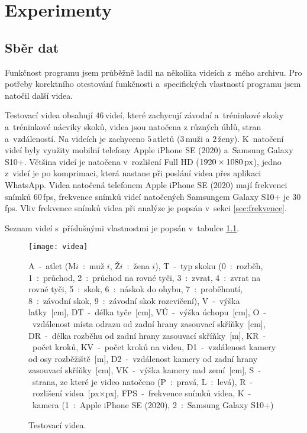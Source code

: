 \chapter{Experimenty}

\section{Sběr dat}

Funkčnost programu jsem průběžně ladil na několika videích z~mého archivu. Pro potřeby korektního otestování funkčnosti a~specifických vlastností programu jsem natočil další videa.

Testovací videa obsahují $46$\,\rm videí, které zachycují závodní a~tréninkové skoky a~tréninkové nácviky skoků, videa jsou natočena z různých úhlů, stran a~vzdáleností. Na videích je zachyceno $5$\,\rm atletů ($3$\,\rm muži a $2$\,\rm ženy). K~natočení videí byly využity mobilní telefony Apple iPhone SE ($2020$) a~Samsung Galaxy S10+. Většina videí je natočena v~rozlišení Full HD ($1920\times 1080\,\rm px$), jedno z~videí je po komprimaci, která nastane při poslání videa přes aplikaci WhatsApp. Videa natočená telefonem Apple iPhone SE ($2020$) mají frekvenci snímků $60$\,\rm fps, frekvence snímků videí natočených Samsungem Galaxy S10+ je $30$\,\rm fps. Vliv frekvence snímků videa při analýze je popsán v~sekci \ref{sec:frekvence}.

Seznam videí s~příslušnými vlastnostmi je popsán v~tabulce \ref{fig:videa}.

\begin{figure}[p]\centering
\texttt{[image: videa]}
\caption{Testovací videa.}
\small
    A~-~atlet 
        (M$i$~:~muž $i$,
        Ž$i$~:~žena $i$), 
    T~-~typ skoku 
        (0~:~rozběh, 
        1~:~průchod, 
        2~:~průchod na rovné tyči, 
        3~:~zvrat, 
        4~:~zvrat na rovné tyči, 
        5~:~skok, 
        6~:~náskok do ohybu, 
        7~:~proběhnutí, 
        8~:~závodní skok, 
        9~:~závodní skok rozcvičení), 
    V~-~výška laťky~[cm], 
    DT~-~délka tyče~[cm], 
    VÚ~-~výška úchopu~[cm], 
    O~-~vzdálenost místa odrazu od zadní hrany zasouvací skříňky~[cm], 
    DR~-~délka rozběhu od zadní hrany zasouvací skříňky~[m], 
    KR~-~počet kroků, 
    KV~-~počet kroků na videu, 
    D1~-~vzdálenost kamery od osy rozběžiště~[m], 
    D2~-~vzdálenost kamery od zadní hrany zasouvací skříňky~[cm], 
    VK~-~výška kamery nad zemí~[cm], 
    S~-~strana, ze které je video natočeno 
        (P~:~pravá, 
        L~:~levá), 
    R~-~rozlišení videa~[px$\times$px], 
    FPS~-~frekvence snímků videa, 
    K~-~kamera 
        (1~:~Apple iPhone SE (2020),
        2~:~Samsung Galaxy S10+)
\label{fig:videa}
\end{figure}


